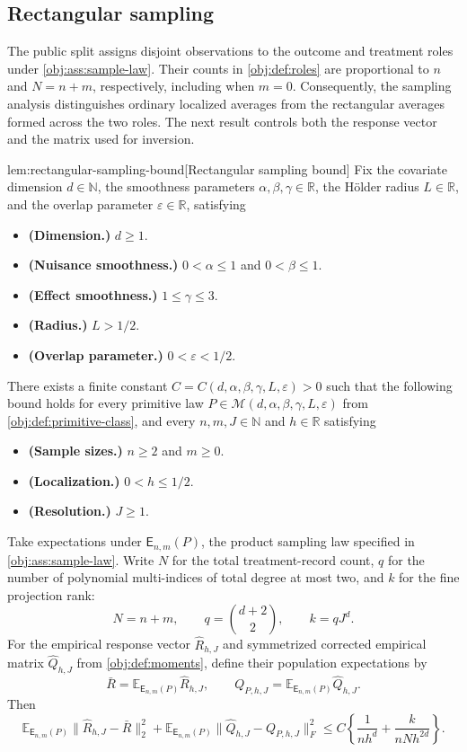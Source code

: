 \subsection{Rectangular sampling}

The public split assigns disjoint observations to the outcome and treatment roles under \cref{obj:ass:sample-law}. Their counts in \cref{obj:def:roles} are proportional to \(n\) and \(N=n+m\), respectively, including when \(m=0\). Consequently, the sampling analysis distinguishes ordinary localized averages from the rectangular averages formed across the two roles. The next result controls both the response vector and the matrix used for inversion.

\begin{lemmav}{lem:rectangular-sampling-bound}[Rectangular sampling bound]
Fix the covariate dimension \(d\in\mathbb N\), the smoothness parameters \(\alpha,\beta,\gamma\in\mathbb R\), the Hölder radius \(L\in\mathbb R\), and the overlap parameter \(\varepsilon\in\mathbb R\), satisfying
\begin{itemize}
\item \textbf{(Dimension.)} \(d\ge1\).
\item \textbf{(Nuisance smoothness.)} \(0<\alpha\le1\) and \(0<\beta\le1\).
\item \textbf{(Effect smoothness.)} \(1\le\gamma\le3\).
\item \textbf{(Radius.)} \(L>1/2\).
\item \textbf{(Overlap parameter.)} \(0<\varepsilon<1/2\).
\end{itemize}
There exists a finite constant \(C=C(d,\alpha,\beta,\gamma,L,\varepsilon)>0\) such that the following bound holds for every primitive law
\(P\in\mathcal M(d,\alpha,\beta,\gamma,L,\varepsilon)\) from \cref{obj:def:primitive-class}, and every \(n,m,J\in\mathbb N\) and \(h\in\mathbb R\) satisfying
\begin{itemize}
\item \textbf{(Sample sizes.)} \(n\ge2\) and \(m\ge0\).
\item \textbf{(Localization.)} \(0<h\le1/2\).
\item \textbf{(Resolution.)} \(J\ge1\).
\end{itemize}
Take expectations under \(\mathsf E_{n,m}(P)\), the product sampling law specified in \cref{obj:ass:sample-law}. Write \(N\) for the total treatment-record count, \(q\) for the number of polynomial multi-indices of total degree at most two, and \(k\) for the fine projection rank:
\[
N=n+m,\qquad q=\binom{d+2}{2},\qquad k=qJ^d.
\]
For the empirical response vector \(\widehat R_{h,J}\) and symmetrized corrected empirical matrix \(\widehat Q_{h,J}\) from \cref{obj:def:moments}, define their population expectations by
\[
\bar R=\mathbb E_{\mathsf E_{n,m}(P)}\widehat R_{h,J},
\qquad
Q_{P,h,J}=\mathbb E_{\mathsf E_{n,m}(P)}\widehat Q_{h,J}.
\]
Then
\[
\mathbb E_{\mathsf E_{n,m}(P)}
 \bigl\|\widehat R_{h,J}-\bar R\bigr\|_2^2
+
\mathbb E_{\mathsf E_{n,m}(P)}
 \bigl\|\widehat Q_{h,J}-Q_{P,h,J}\bigr\|_F^2
\le
C\left\{\frac{1}{nh^d}+\frac{k}{nNh^{2d}}\right\}.
\]
\end{lemmav}

